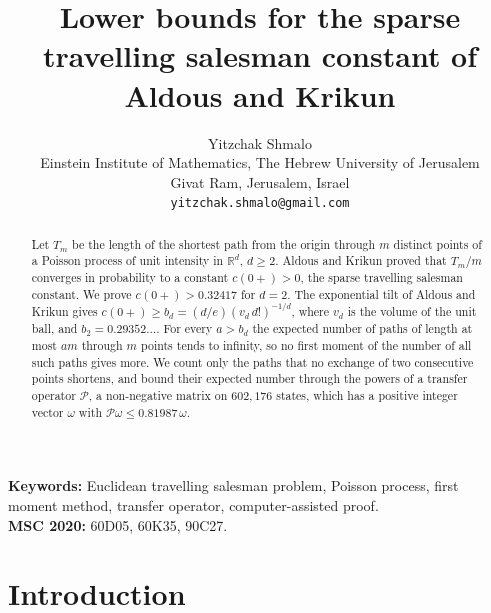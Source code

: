 \documentclass[11pt]{article}
\title{Lower bounds for the sparse travelling salesman constant of Aldous and Krikun}
\author{Yitzchak Shmalo\\
Einstein Institute of Mathematics, The Hebrew University of Jerusalem\\
Givat Ram, Jerusalem, Israel\\
\texttt{yitzchak.shmalo@gmail.com}}
\date{}
\theoremstyle{remark}
\newcommand{\R}{\mathbb{R}}
\begin{document}
\maketitle

\begin{abstract}
Let $T_m$ be the length of the shortest path from the origin through $m$ distinct points of a Poisson process of unit
intensity in $\R^d$, $d\ge 2$. Aldous and Krikun proved that $T_m/m$ converges in probability to a constant
$c(0+)>0$, the sparse travelling salesman constant. We prove $c(0+)>0.32417$ for $d=2$. The exponential tilt of Aldous and Krikun gives
$c(0+)\ge b_d=(d/e)(v_d\,d!)^{-1/d}$, where $v_d$ is the volume of the unit ball, and $b_2=0.29352\dots$. For every $a>b_d$ the expected number
of paths of length at most $am$ through $m$ points tends to infinity, so no first moment of the number of all such
paths gives more. We count only the paths that no exchange of two consecutive points shortens, and bound their
expected number through the powers of a transfer operator $\mathcal P$, a non-negative matrix on $602{,}176$ states, which has a positive integer vector $\omega$ with $\mathcal P\omega\le 0.81987\,\omega$.
\end{abstract}

\noindent\textbf{Keywords:} Euclidean travelling salesman problem, Poisson process, first moment method, transfer
operator, computer-assisted proof.\\
\textbf{MSC 2020:} 60D05, 60K35, 90C27.

\section{Introduction}\label{sec:intro}
\end{document}
